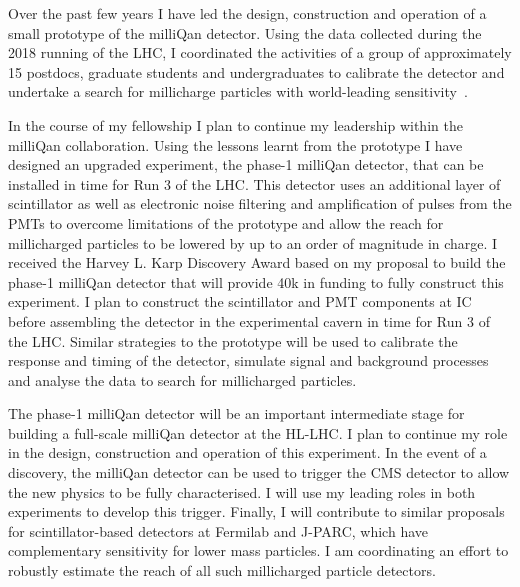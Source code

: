 \documentclass[11pt,a4paper]{article}
\theoremstyle{plain} \numberwithin{equation}{section}
\theoremstyle{definition}
\begin{document}
Over the past few years I have led the design, construction and operation 
of a small prototype of the milliQan detector. Using the data
collected during the 2018 running of the LHC, I coordinated the activities
of a group of approximately 15 postdocs, graduate students 
and undergraduates to calibrate the detector and undertake a
search for millicharge particles with world-leading sensitivity~\cite{ball2020search}. 

In the course of my fellowship I plan to continue my leadership 
within the milliQan collaboration. Using the lessons learnt from the 
prototype I have designed an upgraded experiment, the phase-1 milliQan detector, 
that can be installed in time for Run 3 of the LHC. 
This detector uses an additional layer of scintillator 
as well as electronic noise
filtering and amplification of pulses from the PMTs to overcome limitations of the prototype
and allow the reach for millicharged particles to be lowered by 
up to an order of magnitude in charge. I received the Harvey L. Karp Discovery Award
based on my proposal to build the phase-1 milliQan detector that 
will provide \textsterling40k in funding to 
fully construct this experiment. 
I plan to construct the scintillator and PMT
components at IC before assembling the detector in the experimental cavern
in time for Run 3 of the LHC.  Similar strategies to the prototype will be used to 
calibrate the response and timing of the 
detector, simulate signal and background processes and analyse the data to 
search for millicharged particles. %

The phase-1 milliQan detector will be an important intermediate stage for building a full-scale
milliQan detector at the HL-LHC. I plan to continue my role in the design, construction and
operation of this experiment. In the event of a discovery, the milliQan detector can be used to trigger
the CMS detector to allow the new physics to be fully characterised. 
I will use my leading roles in both experiments to develop this trigger.
Finally, I will contribute to similar proposals for scintillator-based detectors at Fermilab and J-PARC, 
which have complementary sensitivity for lower mass particles. I am coordinating an effort to
robustly estimate the reach of all such millicharged particle detectors.
\end{document}
